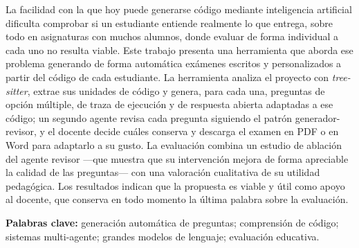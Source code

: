 \noindent La facilidad con la que hoy puede generarse código mediante
inteligencia artificial dificulta comprobar si un estudiante entiende realmente
lo que entrega, sobre todo en asignaturas con muchos alumnos, donde evaluar de
forma individual a cada uno no resulta viable. Este trabajo presenta una
herramienta que aborda ese problema generando de forma automática exámenes
escritos y personalizados a partir del código de cada estudiante. La herramienta
analiza el proyecto con \emph{tree-sitter}, extrae sus unidades de código y
genera, para cada una, preguntas de opción múltiple, de traza de ejecución y de
respuesta abierta adaptadas a ese código; un segundo agente revisa cada pregunta
siguiendo el patrón generador-revisor, y el docente decide cuáles conserva y
descarga el examen en PDF o en Word para adaptarlo a su gusto. La evaluación
combina un estudio de ablación del agente revisor ---que muestra que su
intervención mejora de forma apreciable la calidad de las preguntas--- con una
valoración cualitativa de su utilidad pedagógica. Los resultados indican que la
propuesta es viable y útil como apoyo al docente, que conserva en todo momento
la última palabra sobre la evaluación.

\vspace{1em}
\noindent\textbf{Palabras clave:} generación automática de preguntas;
comprensión de código; sistemas multi-agente; grandes modelos de lenguaje;
evaluación educativa.

\cleardoublepage


